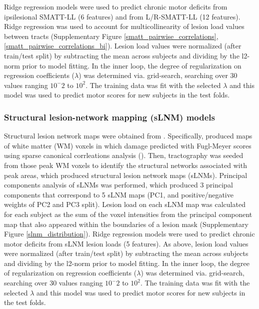 \documentclass[10pt]{article}
\begin{document}
Ridge regression models were used to predict chronic motor deficits from ipsilesional SMATT-LL (6 features) and from L/R-SMATT-LL (12 features). Ridge regression was used to account for multicollinearity of lesion load values between tracts (Supplementary Figure \ref{smatt_pairwise_correlations}, \ref{smatt_pairwise_correlations_bi}). Lesion load values were normalized (after train/test split) by subtracting the mean across subjects and dividing by the l2-norm prior to model fitting. In the inner loop, the degree of regularization on regression coefficients ($\lambda$) was determined via. grid-search, searching over 30 values ranging $10^-2$ to $10^2$. The training data was fit with the selected $\lambda$ and this model was used to predict motor scores for new subjects in the test folds.

\subsubsection*{Structural lesion-network mapping (sLNM) models}
Structural lesion network maps were obtained from \cite{Bowren2022-rs}. Specifically, \cite{Bowren2022-rs} produced maps of white matter (WM) voxels in which damage predicted with Fugl-Meyer scores using sparse canonical corrleations analysis (\cite{Pustina2018-xv}). Then, tractography was seeded from those peak WM voxels to identify the structural networks associated with peak areas, which produced structural lesion network maps (sLNMs). Principal components analysis of sLNMs was performed, which produced 3 principal components that correspond to 5 sLNM maps (PC1, and positive/negative weights of PC2 and PC3 split). Lesion load on each sLNM map was calculated for each subject as the sum of the voxel intensities from the principal component map that also appeared within the boundaries of a lesion mask (Supplementary Figure \ref{slnm_distribution}). Ridge regression models were used to predict chronic motor deficits from sLNM lesion loads (5 features). As above, lesion load values were normalized (after train/test split) by subtracting the mean across subjects and dividing by the l2-norm prior to model fitting. In the inner loop, the degree of regularization on regression coefficients ($\lambda$) was determined via. grid-search, searching over 30 values ranging $10^-2$ to $10^2$. The training data was fit with the selected $\lambda$ and this model was used to predict motor scores for new subjects in the test folds. 
\end{document}
